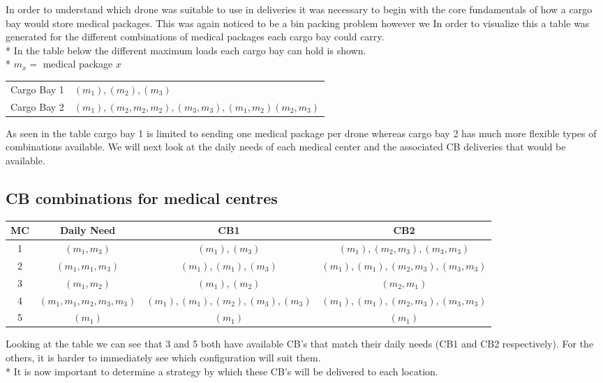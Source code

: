 \documentclass[a4paper,12pt]{article}
\begin{document}
In order to understand which drone was suitable to use in deliveries it was necessary to begin with the core fundamentals
of how a cargo bay would store medical packages. This was again noticed to be a bin packing problem however we In order to visualize this a table was generated for the
different combinations of medical packages each cargo bay could carry.\\*
In the table below the different maximum loads each cargo bay can hold is shown.\\*
$m_x =$ medical package $x$


\begin{center}
\begin{tabular}{ |c|l| }
 \hline
 Cargo Bay 1 & ${(m_1),(m_2),(m_3)}$  \\
 Cargo Bay 2 & ${(m_1),(m_2,m_2,m_2),(m_3,m_3),(m_1,m_2)(m_2,m_3)}$  \\
 \hline
\end{tabular}
\end{center}

As seen in the table cargo bay 1 is limited to sending one medical package per drone whereas cargo bay 2 has much
more flexible types of combinations available.
We will next look at the daily needs of each medical center and the associated CB deliveries that would be available.

\subsection{CB combinations for medical centres}
\begin{center}
\begin{tabular}{ |c|c|c|c| }
 \hline
 MC & Daily Need & CB1 & CB2 \\\hline
  1 & $(m_1,m_3)$ & $(m_1),(m_3)$ & $(m_1),(m_2,m_3),(m_3,m_3)$  \\
  2 & $(m_1,m_1,m_3)$ & $(m_1),(m_1),(m_3)$ & $(m_1),(m_1),(m_2,m_3),(m_3,m_3)$  \\
  3 & $(m_1,m_2)$ & $(m_1),(m_2)$ & $ (m_2,m_1)$  \\
  4 & $(m_1,m_1,m_2,m_3,m_3)$ & $(m_1),(m_1),(m_2),(m_3),(m_3)$ & $(m_1),(m_1),(m_2,m_3),(m_3,m_3)$  \\
  5 & $(m_1)$ & $(m_1)$ & $(m_1)$  \\
\hline
\end{tabular}
\end{center}
Looking at the table we can see that 3 and 5 both have available CB's that match their daily needs (CB1 and CB2 respectively).
For the others, it is harder to immediately see which configuration will suit them.\\*
It is now important to determine a strategy by which these CB's will be delivered to each location.
\end{document}
